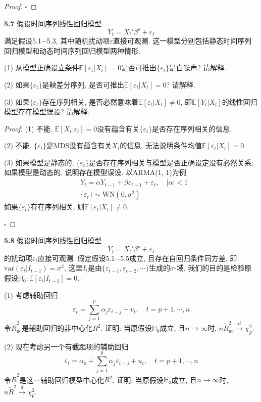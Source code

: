\documentclass[cn,12pt,math=mtpro2,citestyle=gb7714-2015,bibstyle=gb7714-2015,twocol,mode=simple]{elegantbook}
\newcommand{\E}{\mathbb{E}}
\newcommand{\var}{\text{var}}
\begin{document}
\begin{proof}
  $\square$
\end{proof}

\textbf{5.7} 假设时间序列线性回归模型
$$Y_t=X_t'\beta^o+\varepsilon_t$$
满足假设5.1$-$5.3, 其中随机扰动项$\varepsilon$直接可观测. 这一模型分别包括静态时间序列回归模型和动态时间序列回归模型两种情形.

(1) 从模型正确设立条件$\E[\varepsilon_t|X_t]=0$是否可推出$\{\varepsilon_t\}$是白噪声? 请解释.

(2) 如果$\{\varepsilon_t\}$是鞅差分序列, 是否可推出$\E[\varepsilon_t|X_t]=0$? 请解释.

(3) 如果$\{\varepsilon_t\}$存在序列相关, 是否必然意味着$\E[\varepsilon_t|X_t]\neq0$, 即$\E[Y_t|X_t]$的线性回归模型存在模型误设? 请解释.

\begin{proof}
  (1) 不能. $\E[X_t|\varepsilon_t]=0$没有蕴含有关$\{\varepsilon_t\}$是否存在序列相关的信息.

  (2) 不能. $\{\varepsilon_t\}$是MDS没有蕴含有关$X_t$的信息, 无法说明条件均值$\E[\varepsilon_t|X_t]=0$.

  (3) 如果模型是静态的, $\{\varepsilon_t\}$是否存在序列相关与模型是否正确设定没有必然关系; 如果模型是动态的, 说明存在模型误设. 以ARMA(1, 1)为例
   \begin{align*}
  &Y_t=\alpha Y_{t-1}+\beta\varepsilon_{t-1}+\varepsilon_t,\quad |\alpha|<1 \\
  &\{\varepsilon_t\}\sim \text{WN}(0,\sigma^2)
  \end{align*}
  如果$\{\varepsilon_t\}$存在序列相关, 则$\E[\varepsilon_t|X_t]\neq 0$.

  $\square$
\end{proof}

\textbf{5.8} 假设时间序列线性回归模型
$$Y_t=X_t'\beta^o+\varepsilon_t$$
的扰动项$\varepsilon_t$直接可观测. 假定假设5.1$-$5.5成立, 且存在自回归条件同方差, 即$\var(\varepsilon_t|I_{t-1})=\sigma^2$, 这里$I_t$是由$\{\varepsilon_{t-1}, \varepsilon_{t-2},\cdots\}$生成的$\sigma$-域. 我们的目的是检验原假设$\mathbb{H}_0: \E[\varepsilon_t|I_{t-1}]=0$.

(1) 考虑辅助回归
$$\varepsilon_t=\sum_{j=1}^{p}\alpha_j\varepsilon_{t-j}+v_t,\quad t=p+1,\cdots,n$$
令$\tilde{R}_{\text{uc}}^2$是辅助回归的非中心化$R^2$. 证明: 当原假设$\mathbb{H}_0$成立, 且$n\rightarrow\infty$时, $n\tilde{R}_{\text{uc}}^2\xrightarrow{d}\chi_p^2$.

(2) 现在考虑另一个有截距项的辅助回归
$$\varepsilon_t=\alpha_0+\sum_{j=1}^{p}\alpha_j\varepsilon_{t-j}+u_t,\quad t=p+1,\cdots,n$$
令$\tilde{R}^2$是这一辅助回归模型中心化$R^2$. 证明: 当原假设$\mathbb{H}_0$成立, 且$n\rightarrow\infty$时, $n\tilde{R}^2\xrightarrow{d}\chi_p^2$.
\end{document}
